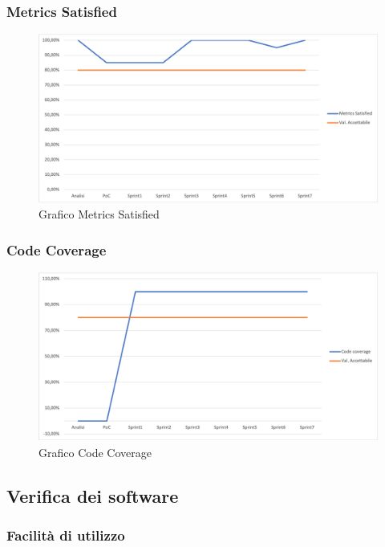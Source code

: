\subsubsection{Metrics Satisfied}

\begin{figure}[H]
\centering
\includegraphics[width=1\textwidth]{src/img/MetricsSat.png}
\caption{Grafico Metrics Satisfied}
\end{figure}

\subsubsection{Code Coverage}

\begin{figure}[H]
\centering
\includegraphics[width=1\textwidth]{src/img/CodeCoverage.png}
\caption{Grafico Code Coverage}
\end{figure}

\subsection{Verifica dei software}

\subsubsection{Facilità di utilizzo}

